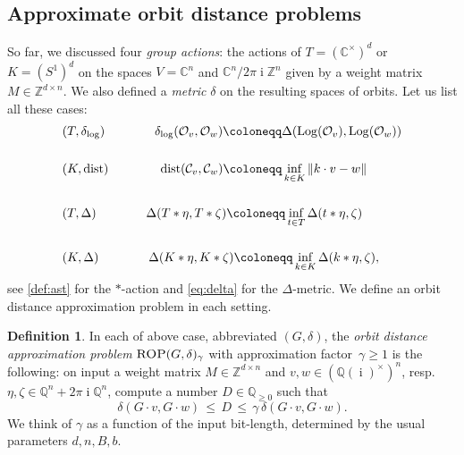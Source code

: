 \documentclass[10pt,a4paper]{article}
\theoremstyle{definition}
\newtheorem{definition}[theorem]{Definition}
\DeclareMathOperator{\ii}{i}
\DeclareMathOperator{\Log}{Log}
\DeclareMathOperator{\dist}{dist}
\newcommand{\distLD}{\delta_{\log}}
\newcommand{\QQ}{\mathbb{Q}}
\newcommand{\CC}{\mathbb{C}}
\newcommand{\ZZ}{\mathbb{Z}}
\newcommand{\OO}{\ensuremath{\mathcal{O}}}
\newcommand{\KK}{\ensuremath{\mathcal{C}}}
\numberwithin{equation}{section}
\begin{document}
\subsection{Approximate orbit distance problems}\label{se:ADP}
So far, we discussed four {\em group actions}:
the actions of $T=(\CC^\times)^d$ or $K=(S^1)^d$ on the spaces
$V=\CC^n$ and $\CC^n/2\pi\ii\ZZ^n$ given by a weight matrix $M\in\ZZ^{d\times n}$.
We also defined a {\em metric} $\delta$ on the resulting spaces of orbits.
Let us list all these cases:
\[
\begin{split}
&(T,\distLD) \qquad \qquad \distLD(\OO_v,\OO_w) \coloneqq \Delta(\Log(\OO_v),\Log(\OO_w))\\
  \vspace{1.5mm}\\
  &(K,\dist) \qquad\qquad \dist(\KK_v,\KK_w) \coloneqq \inf_{k\in K}\Vert k\cdot v-w\Vert\\
 \vspace{1.5mm}\\
  &(T,\Delta) \qquad\qquad \Delta( T\ast \eta, T\ast\zeta ) \coloneqq \inf_{t\in T}\Delta(t\ast\eta, \zeta)\\
 \vspace{1.5mm}\\
 &(K,\Delta) \qquad\qquad \Delta(K\ast\eta,K\ast\zeta)\coloneqq \inf_{k\in K}\Delta(k\ast\eta, \zeta),
\end{split}
\]
see \cref{def:ast} for the $\ast$-action and \cref{eq:delta} for the $\Delta$-metric.
We define an orbit distance approximation problem in each setting.

\begin{definition}
\label{def:gaprop}
In each of above case, abbreviated $(G,\delta)$,
the \textit{orbit distance approximation problem} $\textsc{ROP}(G,\delta)_\gamma$
with approximation factor~$\gamma\geq1$ is the following:
on input a weight matrix $M\in\ZZ^{d\times n}$ and
$v,w \in (\QQ(\ii)^\times)^n$, resp.\ $\eta,\zeta\in\QQ^n+2\pi\ii\QQ^n$,
compute a number $D\in\QQ_{\geq 0}$ such that
\[
  \delta( G\cdot v, G\cdot w ) \, \leq \, D \, \leq  \, \gamma \, \delta(G\cdot v, G\cdot w).
\]
We think of $\gamma$ as a function of the input bit-length, determined by the usual
parameters $d,n,B,b$.
\end{definition}
\end{document}
